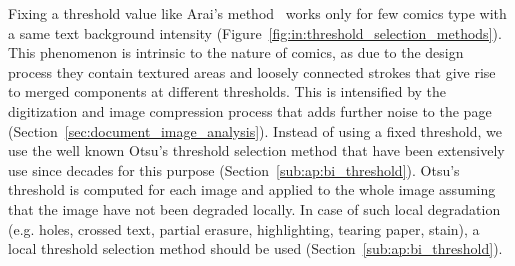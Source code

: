
Fixing a threshold value like Arai's method~\cite{Arai11} works only for few comics type with a same text background intensity (Figure~\ref{fig:in:threshold_selection_methods}).
This phenomenon is intrinsic to the nature of comics, as due to the design process they contain textured areas and loosely connected strokes that give rise to merged components at different thresholds.
This is intensified by the digitization and image compression process that adds further noise to the page (Section~\ref{sec:document_image_analysis}).
Instead of using a fixed threshold, we use the well known Otsu's threshold selection method that have been extensively use since decades for this purpose (Section~\ref{sub:ap:bi_threshold}).
Otsu's threshold is computed for each image and applied to the whole image assuming that the image have not been degraded locally.
In case of such local degradation (e.g. holes, crossed text, partial erasure, highlighting, tearing paper, stain), a local threshold selection method should be used (Section~\ref{sub:ap:bi_threshold}).


